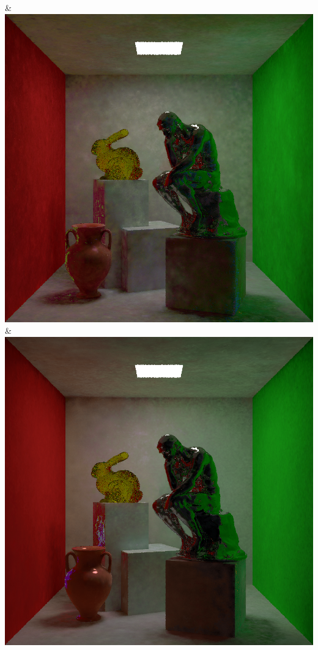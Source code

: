 & \includegraphics[width=\linewidth]{figures/py/tests/batch_size/100+nrc+pt+16@4_1spp.png}
& \includegraphics[width=\linewidth]{figures/py/tests/batch_size/500+nrc+pt+16@4_1spp.png}
